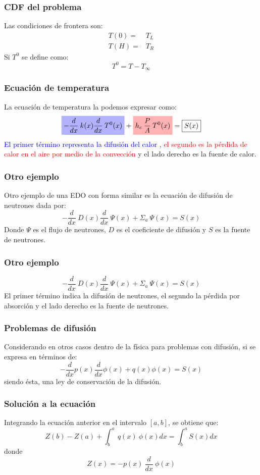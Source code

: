 \begin{frame}
\frametitle{CDF del problema}
Las condiciones de frontera son:
\[ \begin{split} T(0) =& T_{L} \\
T(H) =& T_{R}
\end{split} \]
Si $T^{0}$ se define como:
\[ T^{0} = T - T_{\infty} \]
\end{frame}
\begin{frame}
\frametitle{Ecuación de temperatura}
La ecuación de temperatura la podemos expresar como:
\begin{equation*}
\highlight[blue!30]{- \dfrac{d}{dx} \: k(x) \dfrac{d}{dx} \: T^{0}(x)} +  \highlight[red!30]{h_{c} \: \dfrac{P}{A} \: T^{0}(x)} =  \boxed{S(x)}
 \end{equation*}
\textcolor{blue}{El primer término representa la difusión del calor} \pause, \textcolor{red}{el segundo es la pérdida de calor en el aire por medio de la convección} y el lado derecho es la fuente de calor.
\end{frame}
\begin{frame}
\frametitle{Otro ejemplo}
Otro ejemplo de una EDO con forma similar es la ecuación de difusión de neutrones dada por:
\[ - \dfrac{d}{dx} \: D(x) \dfrac{d}{dx} \: \Psi (x) + \Sigma_{a} \: \Psi (x) = S(x) \]
Donde $\Psi$ es el flujo de neutrones, $D$ es el coeficiente de difusión y $S$ es la fuente de neutrones.
\end{frame}
\begin{frame}
\frametitle{Otro ejemplo}
\[ - \dfrac{d}{dx} \: D(x) \dfrac{d}{dx} \: \Psi (x) + \Sigma_{a} \: \Psi (x) = S(x) \]
El primer término indica la difusión de neutrones, el segundo la pérdida por absorción y el lado derecho es la fuente de neutrones.
\end{frame}
\begin{frame}
\frametitle{Problemas de difusión}
Considerando en otros casos dentro de la física para problemas con difusión, si se expresa en términos de:
\[- \dfrac{d}{dx} p(x) \dfrac{d}{dx} \phi (x) + q(x) \phi (x) = S(x)  \]
siendo ésta, una ley de conservación de la difusión.
\end{frame}
\begin{frame}
\frametitle{Solución a la ecuación}
Integrando la ecuación anterior en el intervalo $[a,b]$, se obtiene que:
\[ Z(b) - Z(a) + \int_{b}^{a} \: q(x) \: \phi (x) dx = \int_{b}^{a} S(x) dx \]
donde
\[ Z(x) = - p(x) \: \dfrac{d}{dx} \: \phi (x) \]
\end{frame}
